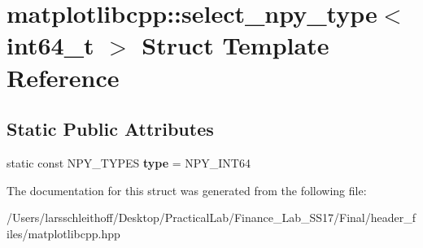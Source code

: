 \hypertarget{structmatplotlibcpp_1_1select__npy__type_3_01int64__t_01_4}{}\section{matplotlibcpp\+:\+:select\+\_\+npy\+\_\+type$<$ int64\+\_\+t $>$ Struct Template Reference}
\label{structmatplotlibcpp_1_1select__npy__type_3_01int64__t_01_4}
\subsection*{Static Public Attributes}
\begin{DoxyCompactItemize}
\item 
\mbox{\label{structmatplotlibcpp_1_1select__npy__type_3_01int64__t_01_4_a0d20ea35e520ad9381aca3c173f3f02d}} 
static const N\+P\+Y\+\_\+\+T\+Y\+P\+ES {\bfseries type} = N\+P\+Y\+\_\+\+I\+N\+T64
\end{DoxyCompactItemize}


The documentation for this struct was generated from the following file\+:\begin{DoxyCompactItemize}
\item 
/\+Users/larsschleithoff/\+Desktop/\+Practical\+Lab/\+Finance\+\_\+\+Lab\+\_\+\+S\+S17/\+Final/header\+\_\+files/matplotlibcpp.\+hpp\end{DoxyCompactItemize}
